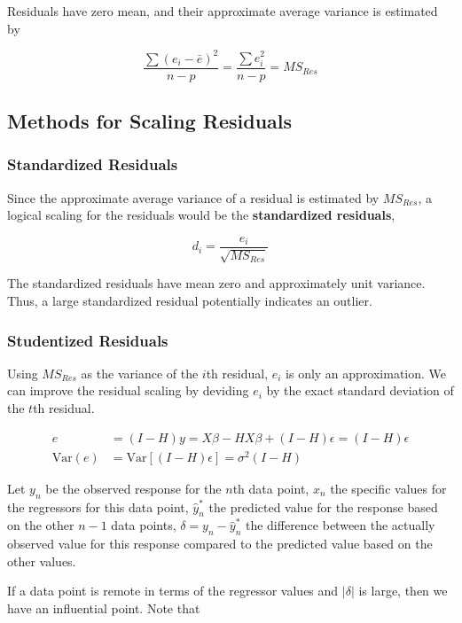 \documentclass[12pt]{article}
\begin{document}
Residuals have zero mean, and their approximate average variance is estimated by

$$
\frac{\sum (e_i - \bar{e})^2}{n-p} = \frac{\sum e_i^2}{n-p} = MS_{Res}
$$


\subsection{Methods for Scaling Residuals}

\subsubsection*{Standardized Residuals}

Since the approximate average variance of a residual is estimated by $MS_{Res}$, a logical scaling for the residuals would be the \textbf{standardized residuals},

$$
d_i = \frac{e_i}{\sqrt{MS_{Res}}}
$$

The standardized residuals have mean zero and approximately unit variance. Thus, a large standardized residual potentially indicates an outlier.


\subsubsection*{Studentized Residuals}

Using $MS_{Res}$ as the variance of the $i$th residual, $e_i$ is only an approximation. We can improve the residual scaling by deviding $e_i$ by the exact standard deviation of the $t$th residual. 

$$
\begin{aligned}
e &= (I - H)y = X\beta - HX\beta + (I-H)\epsilon = (I-H)\epsilon\\[10pt]
\mathrm{Var}(e) &= \mathrm{Var}[(I-H) \epsilon] = \sigma^2 (I-H)
\end{aligned}
$$


Let $y_n$ be the observed response for the $n$th data point, $x_n$ the specific values for the regressors for this data point, $\hat{y}_n^\ast$ the predicted value for the response based on the other $n-1$ data points, $\delta=y_n - \hat{y}_n^\ast$ the difference between the actually observed value for this response compared to the predicted value based on the other values. 

If a data point is remote in terms of the regressor values and $|\delta|$ is large, then we have an influential point. Note that 
\end{document}
